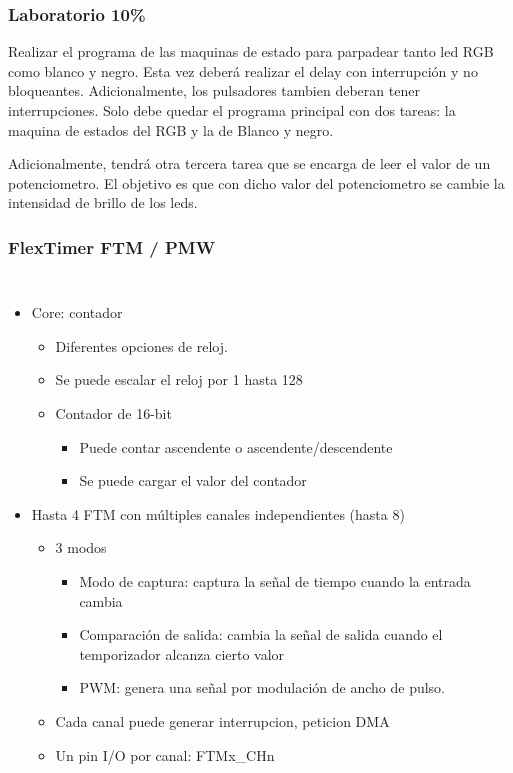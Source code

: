 \documentclass[10.5pt,scale=1.0,t,aspectratio=169,hyperref={pdfpagelabels=false}]{beamer}
\begin{document}
\begin{frame}[fragile]
	\frametitle{Laboratorio 10\%}
	{\small
		Realizar el programa de las maquinas de estado para parpadear tanto led RGB como blanco y negro. Esta vez deberá realizar el delay con interrupción y no bloqueantes. Adicionalmente, los pulsadores tambien deberan tener interrupciones. Solo debe quedar el programa principal con dos tareas: la maquina de estados del RGB y la de Blanco y negro. 
		
		Adicionalmente, tendrá otra tercera tarea que se encarga de leer el valor de un potenciometro. El objetivo es que con dicho valor del potenciometro se cambie la intensidad de brillo de los leds. 		
	}
\end{frame}
\begin{frame}
	\frametitle{FlexTimer FTM / PMW}
	\vspace{-0.3cm}
	{\footnotesize
		\begin{columns}
			\begin{itemize}
				\setlength\itemsep{0em}
				\item Core: contador
				\begin{itemize}
					\item Diferentes opciones de reloj.
					\item Se puede escalar el reloj por 1 hasta 128
					\item Contador de 16-bit
					\begin{itemize}
						\item Puede contar ascendente o ascendente/descendente
						\item Se puede cargar el valor del contador
					\end{itemize}
				\end{itemize}
				\item Hasta 4 FTM con múltiples canales independientes (hasta 8)
				\begin{itemize}
					\item 3 modos
					\begin{itemize}
						\item Modo de captura: captura la señal de tiempo cuando la entrada cambia
						\item Comparación de salida: cambia la señal de salida cuando el temporizador alcanza cierto valor
						\item PWM: genera una señal por modulación de ancho de pulso.
					\end{itemize}
					\item Cada canal puede generar interrupcion, peticion DMA
					\item Un pin I/O por canal: FTMx\_CHn
				\end{itemize}
			\end{itemize}
		

\end{columns}}
\end{frame}
\end{document}
